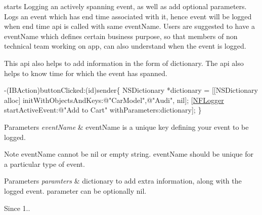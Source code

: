starts Logging an actively spanning event, as well as add optional parameters. Logs an event which has end time associated with it, hence event will be logged when end time api is called with same event\+Name. Users are suggested to have a event\+Name which defines certain business purpose, so that members of non technical team working on app, can also understand when the event is logged. 

This api also helps to add information in the form of dictionary. The api also helps to know time for which the event has spanned.


\begin{DoxyCode}
-(IBAction)buttonClicked:(\textcolor{keywordtype}{id})sender\{
 NSDictionary *dictionary = [[NSDictionary alloc] initWithObjectsAndKeys:\textcolor{stringliteral}{@"CarModel"},\textcolor{stringliteral}{@"Audi"}, nil];
 [\hyperlink{interface_n_f_logger}{NFLogger} startActiveEvent:\textcolor{stringliteral}{@"Add to Cart"} withParameters:dictionary];
\}
\end{DoxyCode}
 
\begin{DoxyParams}{Parameters}
{\em event\+Name} & event\+Name is a unique key defining your event to be logged. \\
\hline
\end{DoxyParams}
\begin{DoxyNote}{Note}
event\+Name cannot be nil or empty string. event\+Name should be unique for a particular type of event. 
\end{DoxyNote}

\begin{DoxyParams}{Parameters}
{\em paramters} & dictionary to add extra information, along with the logged event. parameter can be optionally nil. \\
\hline
\end{DoxyParams}
\begin{DoxySince}{Since}
1.. 
\end{DoxySince}
\mbox{\label{interface_n_f_logger_a943cd3b2d89a9b40f9bb2540d8fcd190}} 

